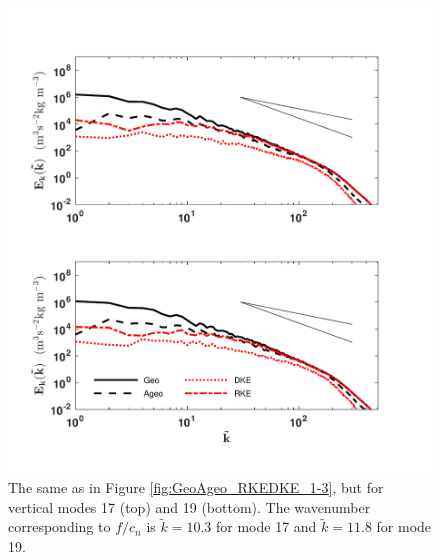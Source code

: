 \begin{figure}[H]
\includegraphics[scale=1]{Chapter4/img/GeoAgeo_RKEDKE_17-19}
\caption{The same as in Figure \ref{fig:GeoAgeo_RKEDKE_1-3}, but for vertical modes 17 (top) and 19 (bottom).  The wavenumber corresponding to $f/c_n$ is $\tilde{k} = 10.3$ for mode 17 and $\tilde{k} = 11.8$ for mode 19.}
\label{fig:GeoAgeo_RKEDKE_17-19}
\end{figure}

